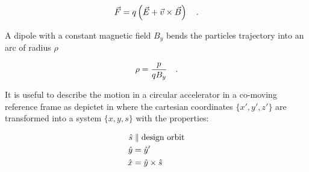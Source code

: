 \begin{equation}
    \vec{F} = q\left(\vec{E} + \vec{v} \times \vec{B}\right)
    \quad .
    \label{eq_lorentz_force}
\end{equation}

A dipole with a constant magnetic field $B_y$ bends the particles trajectory into an arc of radius $\rho$

\begin{equation}
    \rho = \frac{p}{qB_y}
    \quad .
    \label{eq_acc_radius}
\end{equation}

It is useful to describe the motion in a circular accelerator in a co-moving reference frame as
depictet in  where the cartesian coordinates $\{x', y', z'\}$ are
transformed into a system $\{x,y,s\}$ with the properties:

\begin{align}
    \hat{s} &\parallel \text{design orbit}\notag\\
    \hat{y} &= \hat{y}'\notag\\
    \hat{x} &= \hat{y} \times \hat{s}
\end{align}


